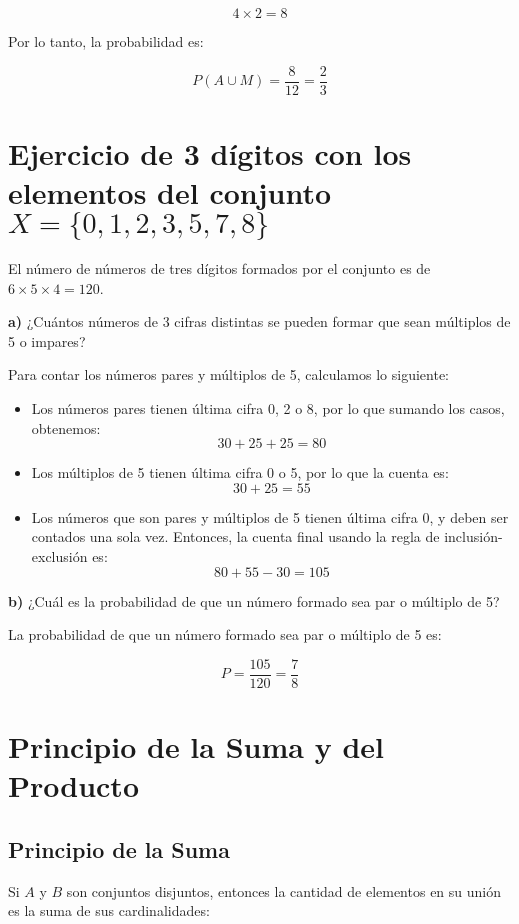 \documentclass{article}
\begin{document}
\[
4 \times 2 = 8
\]

Por lo tanto, la probabilidad es:

\[
P(A \cup M) = \frac{8}{12} = \frac{2}{3}
\]

\section{Ejercicio de 3 dígitos con los elementos del conjunto \( X = \{0,1,2,3,5,7,8\} \)}

El número de números de tres dígitos formados por el conjunto es de \( 6 \times 5 \times 4 = 120 \).

\textbf{a)} ¿Cuántos números de 3 cifras distintas se pueden formar que sean múltiplos de 5 o impares?

Para contar los números pares y múltiplos de 5, calculamos lo siguiente:

\begin{itemize}
    \item Los números pares tienen última cifra 0, 2 o 8, por lo que sumando los casos, obtenemos: 
    \[
    30 + 25 + 25 = 80
    \]
    \item Los múltiplos de 5 tienen última cifra 0 o 5, por lo que la cuenta es:
    \[
    30 + 25 = 55
    \]
    \item Los números que son pares y múltiplos de 5 tienen última cifra 0, y deben ser contados una sola vez. Entonces, la cuenta final usando la regla de inclusión-exclusión es:
    \[
    80 + 55 - 30 = 105
    \]
\end{itemize}

\textbf{b)} ¿Cuál es la probabilidad de que un número formado sea par o múltiplo de 5?

La probabilidad de que un número formado sea par o múltiplo de 5 es:

\[
P = \frac{105}{120} = \frac{7}{8}
\]

\section{Principio de la Suma y del Producto}

\subsection{Principio de la Suma}

Si \( A \) y \( B \) son conjuntos disjuntos, entonces la cantidad de elementos en su unión es la suma de sus cardinalidades:
\end{document}
